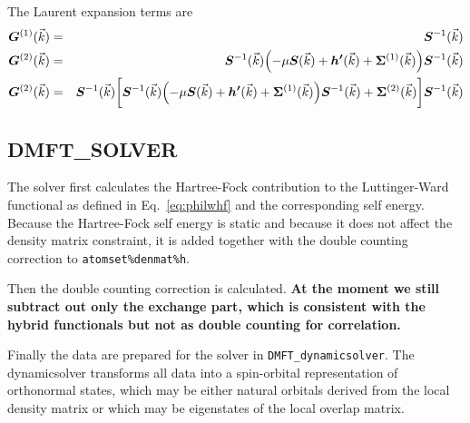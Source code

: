 \documentclass[11pt,a4paper]{report}
\begin{document}
The Laurent expansion terms are
\begin{eqnarray}
\bm{G}^{(1)}(\vec{k})&=&\bm{S}^{-1}(\vec{k})
\nonumber\\
\bm{G}^{(2)}(\vec{k})&=&\bm{S}^{-1}(\vec{k})
\Bigl(-\mu\bm{S}(\vec{k})+\bm{h'}(\vec{k})+\bm{\Sigma}^{(1)}(\vec{k})
\Bigr)
\bm{S}^{-1}(\vec{k})
\nonumber\\
\bm{G}^{(2)}(\vec{k})&=&
\bm{S}^{-1}(\vec{k})
\biggl[
\bm{S}^{-1}(\vec{k})
\Bigl(-\mu\bm{S}(\vec{k})+\bm{h'}(\vec{k})+\bm{\Sigma}^{(1)}(\vec{k})
\Bigr)
\bm{S}^{-1}(\vec{k})+\bm{\Sigma}^{(2)}(\vec{k})
\biggr]
\bm{S}^{-1}(\vec{k})
\nonumber\\
\end{eqnarray}


\subsection{DMFT\_SOLVER}
The solver first calculates the Hartree-Fock contribution to the
Luttinger-Ward functional as defined in Eq.~\ref{eq:philwhf} and the
corresponding self energy. Because the Hartree-Fock self energy is
static and because it does not affect the density matrix constraint,
it is added together with the double counting correction to
\verb|atomset%denmat%h|.


Then the double counting correction is calculated. \textbf{At the
  moment we still subtract out only the exchange part, which is
  consistent with the hybrid functionals but not as double counting
  for correlation.}

Finally the data are prepared for the solver in
\verb|DMFT_dynamicsolver|. The dynamicsolver transforms all data into
a spin-orbital representation of orthonormal states, which may be
either natural orbitals derived from the local density matrix or which
may be eigenstates of the local overlap matrix.


\appendix
\end{document}
